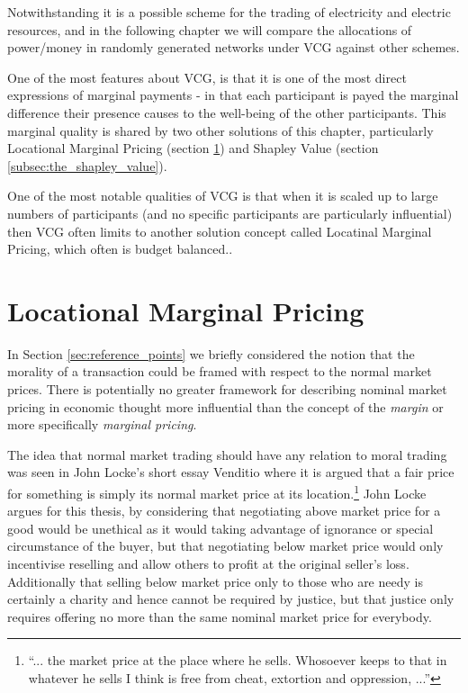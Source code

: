 Notwithstanding it is a possible scheme for the trading of electricity and electric resources, and in the following chapter we will compare the allocations of power/money in randomly generated networks under VCG against other schemes.

One of the most features about VCG, is that it is one of the most direct expressions of marginal payments - in that each participant is payed the marginal difference their presence causes to the well-being of the other participants.
This marginal quality is shared by two other solutions of this chapter, particularly Locational Marginal Pricing (section \ref{sec:solutions_LMP}) and Shapley Value (section \ref{subsec:the_shapley_value}).

One of the most notable qualities of VCG is that when it is scaled up to large numbers of participants (and no specific participants are particularly influential) then VCG often limits to another solution concept called Locatinal Marginal Pricing, which often is budget balanced.\cite{NATH2019673, 8430852}.


\section{Locational Marginal Pricing}\label{sec:solutions_LMP}

In Section \ref{sec:reference_points} we briefly considered the notion that %
the morality of a transaction could be framed with respect to the normal market prices.
There is potentially no greater framework for describing nominal market pricing in economic thought more influential than the concept of the \textit{margin} or more specifically \textit{marginal pricing}.

The idea that normal market trading should have any relation to moral trading was seen in John Locke's short essay Venditio \cite{locke2003locke} where it is argued that a fair price for something is simply its normal market price at its location.\footnote{``... the market price at the place where he sells. Whosoever keeps to that in whatever he sells I think is free from cheat, extortion and oppression, ...''}
John Locke argues for this thesis, by considering that negotiating above market price for a good would be unethical as it would taking advantage of ignorance or special circumstance of the buyer, but that negotiating below market price would only incentivise reselling and allow others to profit at the original seller's loss.
Additionally that selling below market price only to those who are needy is certainly a charity and hence cannot be required by justice, but that justice only requires offering no more than the same nominal market price for everybody.

